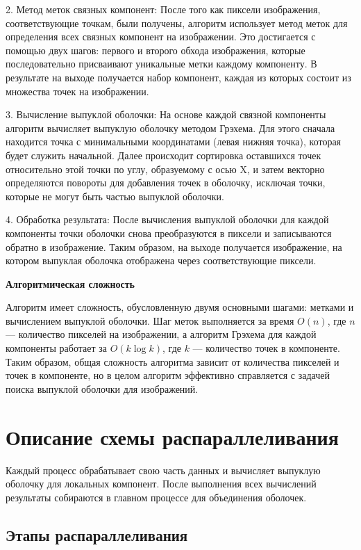 \documentclass{report}
\begin{document}
2. Метод меток связных компонент:
    После того как пиксели изображения, соответствующие точкам, были получены, алгоритм использует метод меток для определения всех связных компонент на изображении. Это достигается с помощью двух шагов: первого и второго обхода изображения, которые последовательно присваивают уникальные метки каждому компоненту. В результате на выходе получается набор компонент, каждая из которых состоит из множества точек на изображении.

3. Вычисление выпуклой оболочки:
    На основе каждой связной компоненты алгоритм вычисляет выпуклую оболочку методом Грэхема. Для этого сначала находится точка с минимальными координатами (левая нижняя точка), которая будет служить начальной. Далее происходит сортировка оставшихся точек относительно этой точки по углу, образуемому с осью X, и затем векторно определяются повороты для добавления точек в оболочку, исключая точки, которые не могут быть частью выпуклой оболочки.

4. Обработка результата:
    После вычисления выпуклой оболочки для каждой компоненты точки оболочки снова преобразуются в пиксели и записываются обратно в изображение. Таким образом, на выходе получается изображение, на котором выпуклая оболочка отображена через соответствующие пиксели.

\textbf{Алгоритмическая сложность}  

Алгоритм имеет сложность, обусловленную двумя основными шагами: метками и вычислением выпуклой оболочки. Шаг меток выполняется за время $O(n)$, где $n$ — количество пикселей на изображении, а алгоритм Грэхема для каждой компоненты работает за $O(k \log k)$, где $k$ — количество точек в компоненте. Таким образом, общая сложность алгоритма зависит от количества пикселей и точек в компоненте, но в целом алгоритм эффективно справляется с задачей поиска выпуклой оболочки для изображений.

\newpage
\section*{Описание схемы распараллеливания}

Каждый процесс обрабатывает свою часть данных и вычисляет выпуклую оболочку для локальных компонент. После выполнения всех вычислений результаты собираются в главном процессе для объединения оболочек.

\subsection*{Этапы распараллеливания}
\end{document}
